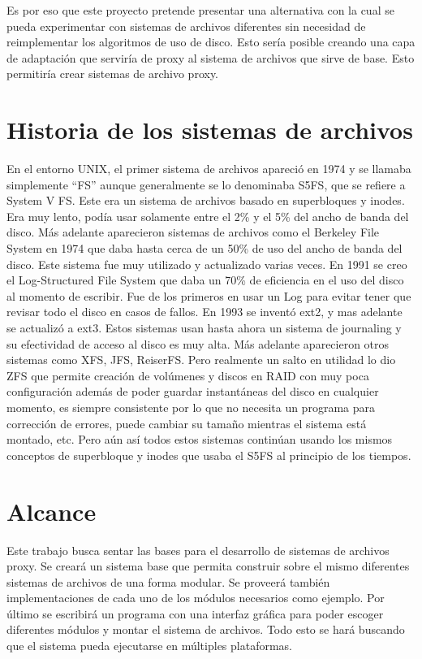 Es por eso que este proyecto pretende presentar una alternativa con la cual se pueda experimentar con sistemas de archivos diferentes sin necesidad de reimplementar los algoritmos de uso de disco. Esto sería posible creando una capa de adaptación que serviría de proxy al sistema de archivos que sirve de base. Esto permitiría crear sistemas de archivo proxy.


\section{Historia de los sistemas de archivos}

En el entorno UNIX, el primer sistema de archivos apareció en 1974 y se llamaba simplemente ``FS'' aunque generalmente se lo denominaba S5FS, que se refiere a System V FS. Este era un sistema de archivos basado en superbloques y inodes. Era muy lento, podía usar solamente entre el 2\% y el 5\% del ancho de banda del disco. Más adelante aparecieron sistemas de archivos como el Berkeley File System en 1974 que daba hasta cerca de un 50\% de uso del ancho de banda del disco. Este sistema fue muy utilizado y actualizado varias veces. En 1991 se creo el Log-Structured File System que daba un 70\% de eficiencia en el uso del disco al momento de escribir. Fue de los primeros en usar un Log para evitar tener que revisar todo el disco en casos de fallos. En 1993 se inventó ext2, y mas adelante se actualizó a ext3. Estos sistemas usan hasta ahora un sistema de journaling y su efectividad de acceso al disco es muy alta. Más adelante aparecieron otros sistemas como XFS, JFS, ReiserFS. Pero realmente un salto en utilidad lo dio ZFS que permite creación de volúmenes y discos en RAID con muy poca configuración además de poder guardar instantáneas del disco en cualquier momento, es siempre consistente por lo que no necesita un programa para corrección de errores, puede cambiar su tamaño mientras el sistema está montado, etc. Pero aún así todos estos sistemas continúan usando los mismos conceptos de superbloque y inodes que usaba el S5FS al principio de los tiempos.


\section{Alcance}

Este trabajo busca sentar las bases para el desarrollo de sistemas de archivos proxy. Se creará un sistema base que permita construir sobre el mismo diferentes sistemas de archivos de una forma modular. Se proveerá también implementaciones de cada uno de los módulos necesarios como ejemplo. Por último se escribirá un programa con una interfaz gráfica para poder escoger diferentes módulos y montar el sistema de archivos. Todo esto se hará buscando que el sistema pueda ejecutarse en múltiples plataformas.


